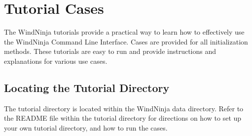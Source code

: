 %
%
%

\section*{Tutorial Cases}

The WindNinja tutorials provide a practical way to learn how to effectively use the WindNinja Command Line Interface. Cases are provided for all initialization methods. These tutorials are easy to run and provide instructions and explanations for various  use cases.

\subsection*{   Locating the Tutorial Directory}
The tutorial directory is located within the WindNinja data directory. Refer to the README file within the tutorial directory for directions on how to set up your own tutorial directory, and how to run the cases.  


